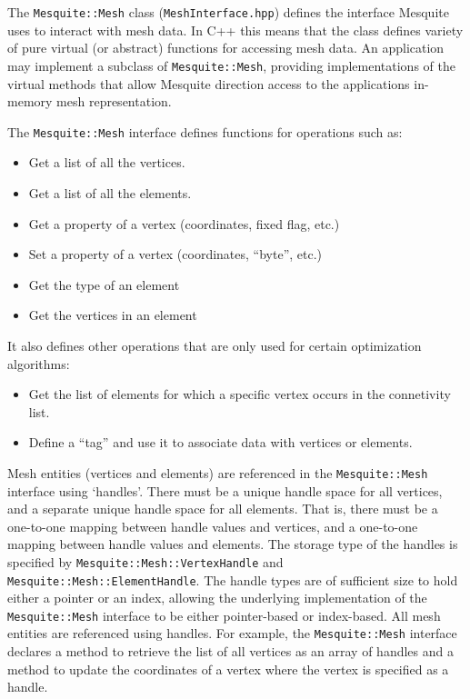 The \texttt{Mesquite::Mesh} class (\texttt{MeshInterface.hpp}) defines the interface Mesquite uses to interact with mesh data.  In C++ this means that the class defines variety of pure virtual (or abstract) functions for accessing mesh data.  An application may implement a subclass of \texttt{Mesquite::Mesh}, providing implementations of the virtual methods that allow Mesquite direction access to the applications in-memory mesh representation.  

The \texttt{Mesquite::Mesh} interface defines functions for operations such as:
\begin{itemize}
\item Get a list of all the vertices.
\item Get a list of all the elements.
\item Get a property of a vertex (coordinates, fixed flag, etc.)
\item Set a property of a vertex (coordinates, ``byte'', etc.)
\item Get the type of an element
\item Get the vertices in an element
\end{itemize}
It also defines other operations that are only used for certain optimization algorithms:
\begin{itemize}
\item Get the list of elements for which a specific vertex occurs in the connetivity list.
\item Define a ``tag'' and use it to associate data with vertices or elements.
\end{itemize}

Mesh entities (vertices and elements) are referenced in the \texttt{Mesquite::Mesh} interface using `handles'.  There must be a unique handle
space for all vertices, and a separate unique handle space for all elements. 
That is, there must be a one-to-one mapping between handle values and vertices,
and a one-to-one mapping between handle values and elements.  The storage type of
the handles is specified by \texttt{Mesquite::Mesh::VertexHandle} and
\texttt{Mesquite::Mesh::ElementHandle}.  The handle types are of sufficient size
to hold either a pointer or an index, allowing the underlying implementation of
the \texttt{Mesquite::Mesh} interface to be either pointer-based or index-based. 
All mesh entities are referenced using handles.  For example, the
\texttt{Mesquite::Mesh} interface declares a method to retrieve the list of all
vertices as an array of handles and a method to update the coordinates of a
vertex where the vertex is specified as a handle.

